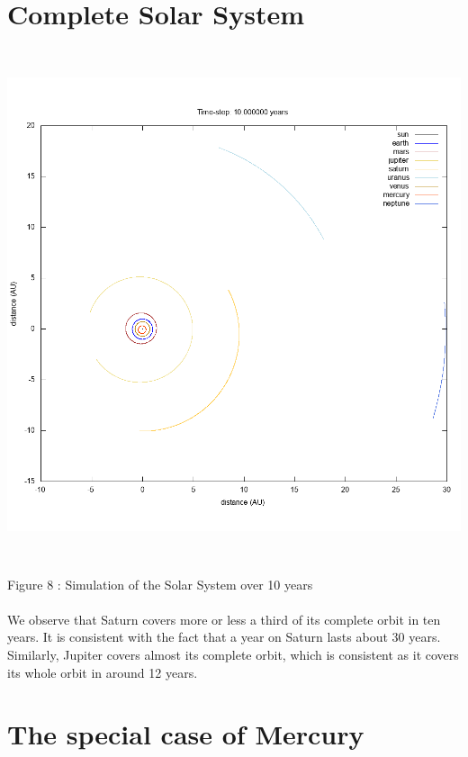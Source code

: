 \documentclass[a4paper, twoside, 11pt]{report}
\theoremstyle{theorem}
\theoremstyle{remark}
\theoremstyle{exemple}
\begin{document}
            
    \section{Complete Solar System}
        \begin{center}
            \includegraphics[width=15cm,height=15cm]{System_10}
        \end{center}
        \begin{center}
            Figure 8 : Simulation of the Solar System over 10 years
        \end{center}
        \paragraph{}We observe that Saturn covers more or less a third of its complete orbit in ten years. It is consistent with the fact that a year on Saturn lasts about 30 years. Similarly, Jupiter covers almost its complete orbit, which is consistent as it covers its whole orbit in around 12 years. 
        
    
    \section{The special case of Mercury}
\end{document}
